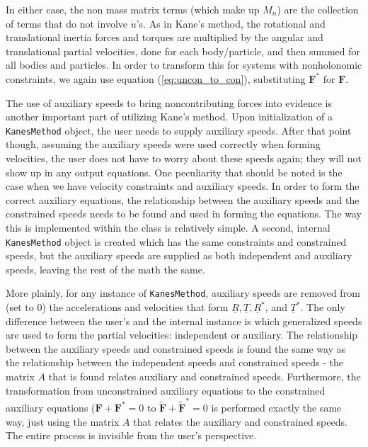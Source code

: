 \documentclass[twocolumn,10pt]{asme2e}
\begin{document}
In either case, the non mass matrix terms (which make up $M_n$) are the
collection of terms that do not involve $\dot{u}$'s.
As in Kane's method, the rotational and translational inertia forces and
torques are multiplied by the angular and translational partial velocities,
done for each body/particle, and then summed for all bodies and particles.
In order to transform this for systems with nonholonomic constraints, we again
use equation (\ref{eq:uncon_to_con}), substituting $\mathbf{F}^*$ for
$\mathbf{F}$.

The use of auxiliary speeds to bring noncontributing forces into evidence is
another important part of utilizing Kane's method.
Upon initialization of a \verb|KanesMethod| object, the user needs to supply
auxiliary speeds.
After that point though, assuming the auxiliary speeds were used correctly when
forming velocities, the user does not have to worry about these speeds again;
they will not show up in any output equations.
One peculiarity that should be noted is the case when we have velocity
constraints and auxiliary speeds.
In order to form the correct auxiliary equations, the relationship between the
auxiliary speeds and the constrained speeds needs to be found and used in
forming the equations.
The way this is implemented within the class is relatively simple.
A second, internal \verb|KanesMethod| object is created which has the same
constraints and constrained speeds, but the auxiliary speeds are supplied as
both independent and auxiliary speeds, leaving the rest of the math the same.

More plainly, for any instance of \verb|KanesMethod|, auxiliary speeds are
removed from (set to 0) the accelerations and velocities that form
$\underline{R}, \underline{T}, \underline{R}^*$, and $\underline{T}^*$.
The only difference between the user's and the internal instance is which
generalized speeds are used to form the partial velocities: independent or
auxiliary.
The relationship between the auxiliary speeds and constrained speeds is found
the same way as the relationship between the independent speeds and constrained
speeds - the matrix $A$ that is found relates auxiliary and constrained
speeds.
Furthermore, the transformation from unconstrained auxiliary equations to the
constrained auxiliary equations ($\mathbf{F} + \mathbf{F}^*=0$ to
$\tilde{\mathbf{F}} + \tilde{\mathbf{F}}^* = 0$ is performed exactly the same
way, just using the matrix $A$ that relates the auxiliary and constrained
speeds.
The entire process is invisible from the user's perspective.
\end{document}
